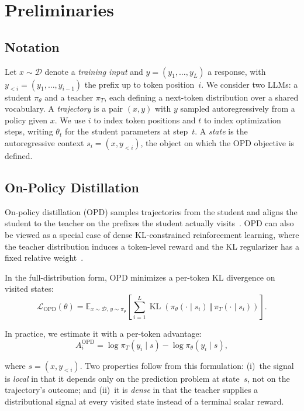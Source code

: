 \section{Preliminaries}
\label{sec:prelim}

\subsection{Notation}
Let $x\sim\mathcal{D}$ denote a \emph{training input} and $y=(y_1,\ldots,y_L)$ a response, with $y_{<i}=(y_1,\ldots,y_{i-1})$ the prefix up to token position~$i$. We consider two LLMs: a student $\pi_{\theta}$ and a teacher $\pi_T$, each defining a next-token distribution over a shared vocabulary. A \emph{trajectory} is a pair $(x,y)$ with $y$ sampled autoregressively from a policy given $x$. We use $i$ to index token positions and $t$ to index optimization steps, writing $\theta_t$ for the student parameters at step~$t$. A \emph{state} is the autoregressive context $s_i=(x,y_{<i})$, the object on which the OPD objective is defined. 

\subsection{On-Policy Distillation}
On-policy distillation (OPD) samples trajectories from the student and aligns the student to the teacher on the prefixes the student actually visits~\citep{agarwal2024policy}. OPD can also be viewed as a special case of dense KL-constrained reinforcement learning, where the teacher distribution induces a token-level reward and the KL regularizer has a fixed relative weight~\citep{yang2026learning}.
 
In the full-distribution form, OPD minimizes a per-token KL divergence on visited states:
\begin{equation}
    \mathcal{L}_{\mathrm{OPD}}(\theta)
    =
    \mathbb{E}_{x\sim\mathcal{D},\,y\sim\pi_\theta}
    \left[
        \sum_{i=1}^{L}
        \operatorname{KL}\!\left(
            \pi_\theta(\cdot\mid s_i)
            \,\Vert\,
            \pi_T(\cdot\mid s_i)
        \right)
    \right].
\end{equation}

In practice, we estimate it with a per-token advantage:
\begin{equation}
    A_i^{\mathrm{OPD}} = \log \pi_T(y_i \mid s) - \log \pi_\theta(y_i \mid s),
    \label{eq:token-advantage}
\end{equation}

where $s = (x, y_{<i})$. Two properties follow from this formulation: (i)~the signal is \emph{local} in that it depends only on the prediction problem at state~$s$, not on the trajectory's outcome; and (ii)~it is \emph{dense} in that the teacher supplies a distributional signal at every visited state instead of a terminal scalar reward.

